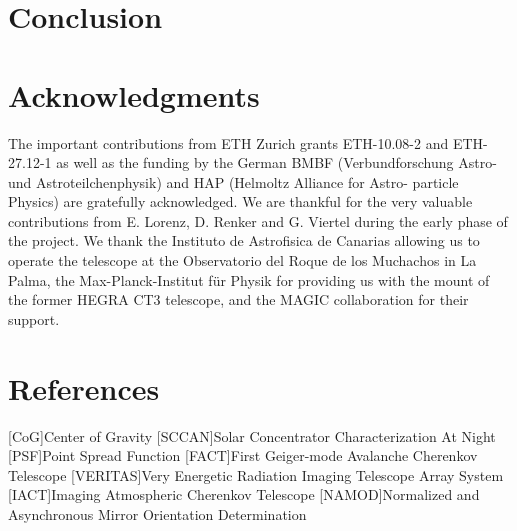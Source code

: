 \documentclass[review]{elsarticle}
\begin{document}
\section{Conclusion}

%
\section*{Acknowledgments}
%
The important contributions from ETH Zurich grants ETH-10.08-2 and ETH-27.12-1 as well as the funding by the German BMBF (Verbundforschung Astro- und Astroteilchenphysik) and HAP (Helmoltz Alliance for Astro- particle Physics) are gratefully acknowledged. 
%
We are thankful for the very valuable contributions from E. Lorenz, D. Renker and G. Viertel during the early phase of the project. 
%
We thank the Instituto de Astrofisica de Canarias allowing us to operate the telescope at the Observatorio del Roque de los Muchachos in La Palma, the Max-Planck-Institut für Physik for providing us with the mount of the former HEGRA CT3 telescope, and the MAGIC collaboration for their support.
%
\section*{References}

%
\begin{acronym}
    [CoG]{Center of Gravity}
	[SCCAN]{Solar Concentrator Characterization At Night}
	[PSF]{Point Spread Function}
	[FACT]{First Geiger-mode Avalanche Cherenkov Telescope}
	[VERITAS]{Very Energetic Radiation Imaging Telescope Array System}
    [IACT]{Imaging Atmospheric Cherenkov Telescope}
    [NAMOD]{Normalized and Asynchronous Mirror Orientation Determination}
\end{acronym}
\end{document}

